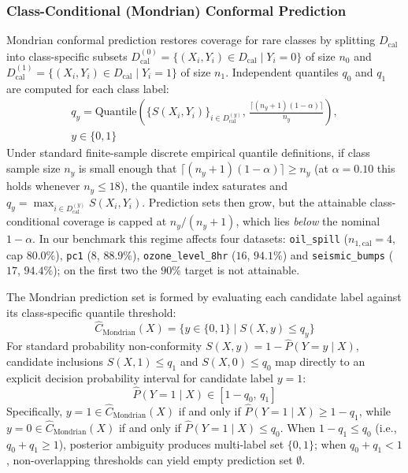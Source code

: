 \documentclass{ieeetj}
\begin{document}
\subsubsection{Class-Conditional (Mondrian) Conformal Prediction}
Mondrian conformal prediction restores coverage for rare classes by splitting $D_{\mathrm{cal}}$ into class-specific subsets $D_{\mathrm{cal}}^{(0)} = \{(X_i, Y_i) \in D_{\mathrm{cal}} \mid Y_i = 0\}$ of size $n_0$ and $D_{\mathrm{cal}}^{(1)} = \{(X_i, Y_i) \in D_{\mathrm{cal}} \mid Y_i = 1\}$ of size $n_1$. Independent quantiles $q_0$ and $q_1$ are computed for each class label:
\begin{equation}
\begin{split}
q_y = \text{Quantile}\!\left(\{S(X_i, Y_i)\}_{i \in D_{\mathrm{cal}}^{(y)}}, \, \tfrac{\lceil (n_y+1)(1-\alpha) \rceil}{n_y}\right), \\
y \in \{0, 1\}
\end{split}
\label{eq:mondrian_quantile}
\end{equation}
Under standard finite-sample discrete empirical quantile definitions, if class sample size $n_y$ is small enough that $\lceil (n_y+1)(1-\alpha) \rceil \ge n_y$ (at $\alpha=0.10$ this holds whenever $n_y \le 18$), the quantile index saturates and $q_y = \max_{i \in D_{\mathrm{cal}}^{(y)}} S(X_i, Y_i)$. Prediction sets then grow, but the attainable class-conditional coverage is capped at $n_y/(n_y+1)$, which lies \emph{below} the nominal $1-\alpha$. In our benchmark this regime affects four datasets: \texttt{oil\_spill} ($n_{1,\mathrm{cal}}=4$, cap $80.0\%$), \texttt{pc1} ($8$, $88.9\%$), \texttt{ozone\_level\_8hr} ($16$, $94.1\%$) and \texttt{seismic\_bumps} ($17$, $94.4\%$); on the first two the $90\%$ target is not attainable.

The Mondrian prediction set is formed by evaluating each candidate label against its class-specific quantile threshold:
\begin{equation}
\hat{C}_{\mathrm{Mondrian}}(X) = \{y \in \{0, 1\} \mid S(X, y) \le q_y\}
\label{eq:mondrian_set}
\end{equation}
For standard probability non-conformity $S(X,y) = 1 - \hat{P}(Y=y \mid X)$, candidate inclusions $S(X,1) \le q_1$ and $S(X,0) \le q_0$ map directly to an explicit decision probability interval for candidate label $y=1$:
\begin{equation}
\hat{P}(Y=1 \mid X) \in [1 - q_0, \, q_1]
\end{equation}
Specifically, $y=1 \in \hat{C}_{\mathrm{Mondrian}}(X)$ if and only if $\hat{P}(Y=1 \mid X) \ge 1 - q_1$, while $y=0 \in \hat{C}_{\mathrm{Mondrian}}(X)$ if and only if $\hat{P}(Y=1 \mid X) \le q_0$. When $1 - q_1 \le q_0$ (i.e., $q_0 + q_1 \ge 1$), posterior ambiguity produces multi-label set $\{0, 1\}$; when $q_0 + q_1 < 1$, non-overlapping thresholds can yield empty prediction set $\emptyset$.
\end{document}
